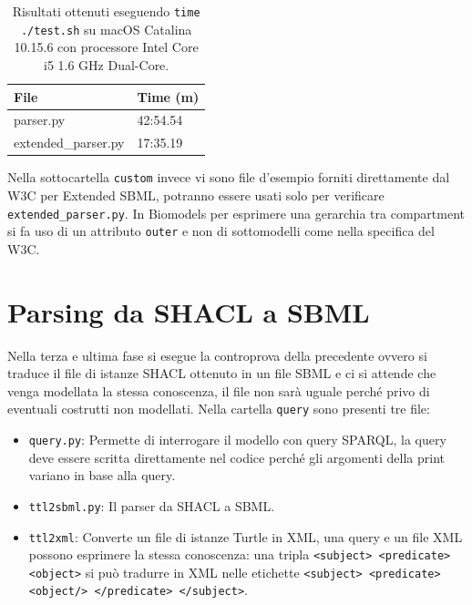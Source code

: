 \documentclass{article}
\begin{document}
\begin{table}[h!t] 
    \centering
    \begin{longtable}{p{}p{}}
        \textbf{File} & \textbf{Time (m)} \\
        \hline
        parser.py & 42:54.54 \\
        extended\_parser.py & 17:35.19 \\
        \hline
    \end{longtable}
    \caption{Risultati ottenuti eseguendo \texttt{time ./test.sh} su macOS Catalina 10.15.6 con processore Intel Core i5 1.6 GHz Dual-Core.}
    \label{tab:performance}
\end{table}

Nella sottocartella \texttt{custom} invece vi sono file d'esempio forniti direttamente dal W3C per Extended SBML, potranno essere usati solo per verificare \texttt{extended\_parser.py}. In Biomodels per esprimere una gerarchia tra compartment si fa uso di un attributo \texttt{outer} e non di sottomodelli come nella specifica del W3C.

\clearpage
\section{Parsing da SHACL a SBML}
Nella terza e ultima fase si esegue la controprova della precedente ovvero si traduce il file di istanze SHACL ottenuto in un file SBML e ci si attende che venga modellata la stessa conoscenza, il file non sarà uguale perché privo di eventuali costrutti non modellati. Nella cartella \texttt{query} sono presenti tre file:

\begin{itemize}
    \item \texttt{query.py}: Permette di interrogare il modello con query SPARQL, la query deve essere scritta direttamente nel codice perché gli argomenti della print variano in base alla query.
    \item \texttt{ttl2sbml.py}: Il parser da SHACL a SBML.
    \item \texttt{ttl2xml}: Converte un file di istanze Turtle in XML, una query e un file XML possono esprimere la stessa conoscenza: una tripla \texttt{<subject> <predicate> <object>} si può tradurre in XML nelle etichette \texttt{<subject> <predicate> <object/> </predicate> </subject>}.
\end{itemize}
\end{document}
